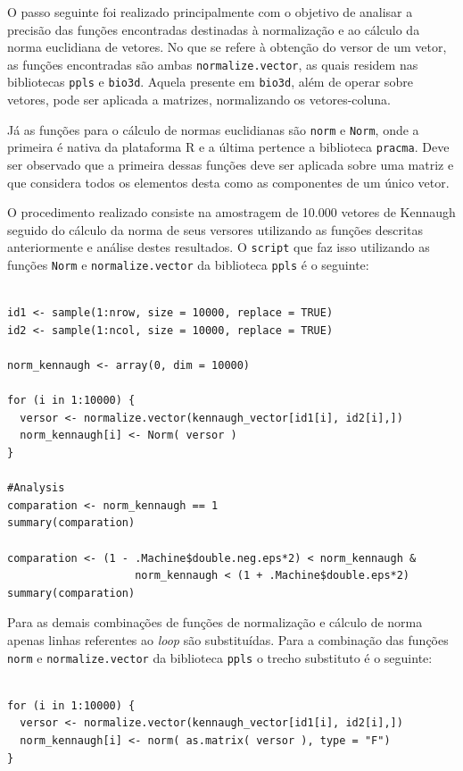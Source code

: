 \documentclass[12pt]{article}
\begin{document}
O passo seguinte foi realizado principalmente com o objetivo de analisar a precisão das funções encontradas destinadas à normalização e ao cálculo da norma euclidiana de vetores. No que se refere à obtenção do versor de um vetor, as funções encontradas são ambas \texttt{normalize.vector}, as quais residem nas bibliotecas \texttt{ppls} e \texttt{bio3d}. Aquela presente em \texttt{bio3d}, além de operar sobre vetores, pode ser aplicada a matrizes, normalizando os vetores-coluna.

Já as funções para o cálculo de normas euclidianas são \texttt{norm} e \texttt{Norm}, onde a primeira é nativa da plataforma R e a última pertence a biblioteca \texttt{pracma}. Deve ser observado que a primeira dessas funções deve ser aplicada sobre uma matriz e que considera todos os elementos desta como as componentes de um único vetor.

O procedimento realizado consiste na amostragem de 10.000 vetores de Kennaugh seguido do cálculo da norma de seus versores utilizando as funções descritas anteriormente e análise destes resultados. O \texttt{script} que faz isso utilizando as funções \texttt{Norm} e \texttt{normalize.vector} da biblioteca \texttt{ppls} é o seguinte:

\begin{verbatim}

id1 <- sample(1:nrow, size = 10000, replace = TRUE)
id2 <- sample(1:ncol, size = 10000, replace = TRUE)

norm_kennaugh <- array(0, dim = 10000)

for (i in 1:10000) {
  versor <- normalize.vector(kennaugh_vector[id1[i], id2[i],])
  norm_kennaugh[i] <- Norm( versor )
}

#Analysis
comparation <- norm_kennaugh == 1
summary(comparation)

comparation <- (1 - .Machine$double.neg.eps*2) < norm_kennaugh &
                    norm_kennaugh < (1 + .Machine$double.eps*2)
summary(comparation)

\end{verbatim}

Para as demais combinações de funções de normalização e cálculo de norma apenas linhas referentes ao \textit{loop} são substituídas. Para a combinação das funções \texttt{norm} e \texttt{normalize.vector} da biblioteca \texttt{ppls} o trecho substituto é o seguinte:

\begin{verbatim}
    
for (i in 1:10000) {
  versor <- normalize.vector(kennaugh_vector[id1[i], id2[i],])
  norm_kennaugh[i] <- norm( as.matrix( versor ), type = "F")
}
    
\end{verbatim}
\end{document}
